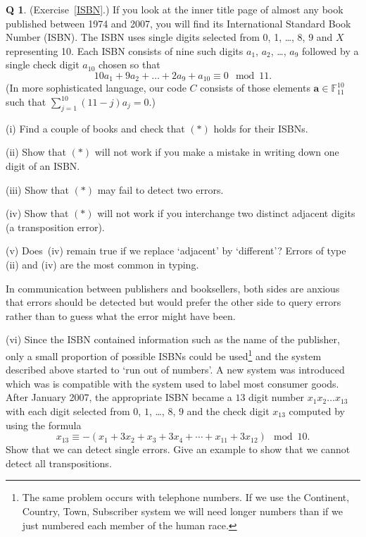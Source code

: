 \documentclass[12pt,a4paper]{article}
\theoremstyle{plain}
\theoremstyle{definition}
\newtheorem{question}[theorem]{Q}
\begin{document}
\begin{question}\label{C2.3} (Exercise~\ref{ISBN}.)
If you look
at the inner
title page of almost any book
published between 1974 and 2007,
you will find its International Standard
Book Number (ISBN). The ISBN
uses single digits selected from 0, 1, \dots, 8, 9
and $X$ representing 10. Each ISBN consists
of nine such digits $a_{1}$, $a_{2}$, \dots, $a_{9}$
followed by a single check digit $a_{10}$ chosen
so that
\begin{equation*}
10a_{1}+9a_{2}+ \dots+2a_{9}+a_{10}\equiv 0\mod{11}.\tag*{(*)}
\end{equation*}
(In more sophisticated language, our code $C$ consists
of those elements ${\mathbf a}\in {\mathbb F}_{11}^{10}$
such that $\sum_{j=1}^{10}(11-j)a_{j}=0$.)


(i) Find a couple of books
and check that $(*)$ holds for their ISBNs.

(ii) Show that $(*)$ will not work if you make a mistake
in writing down one digit of an ISBN.

(iii) Show that
$(*)$ may fail to detect two errors.

(iv)  Show that $(*)$ will not work if you interchange
two distinct adjacent digits (a transposition error).

(v) Does~(iv) remain true if we replace `adjacent'
by `different'?
\noindent Errors of type (ii) and (iv) are the most common
in typing.

In communication between publishers and booksellers,
both sides are anxious that errors should be detected
but would prefer the other side to query errors
rather than to guess what the error might have been.

(vi) Since the ISBN contained information such as the name of the
publisher, only a small proportion of possible ISBNs could
be used\footnote{The same problem occurs with telephone numbers.
If we use the Continent, Country, Town, Subscriber system
we will need longer numbers than if we just numbered
each member of the human race.} 
and the system described above
started to `run out of numbers'. A new system
was  introduced which was
is compatible with the system used to label most consumer goods.
After January 2007, the appropriate ISBN became a $13$ digit number
$x_{1}x_{2}\dots x_{13}$ with each digit 
selected from $0$, $1$, \dots, $8$, $9$ and
the check digit $x_{13}$ computed by using the formula
\[x_{13}\equiv -(x_{1}+3x_{2}+x_{3}+3x_{4}+\cdots+x_{11}+ 3x_{12}) 
\mod{10}.\]
Show that we can detect single errors. Give an example
to show that we cannot detect all transpositions.
\end{question}
\end{document}
